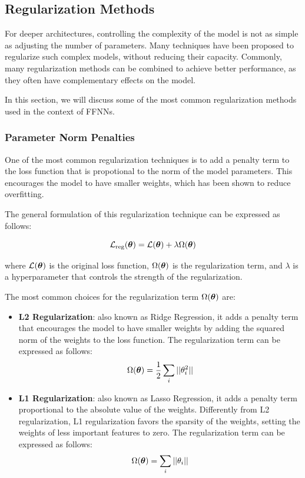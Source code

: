 \subsection{Regularization Methods}
For deeper architectures, controlling the complexity of the model is not as simple as adjusting the number of parameters.
Many techniques have been proposed to regularize such complex models, without reducing their capacity.
Commonly, many regularization methods can be combined to achieve better performance, as they often have complementary effects on the model.

In this section, we will discuss some of the most common regularization methods used in the context of FFNNs.

\subsubsection{Parameter Norm Penalties}

One of the most common regularization techniques is to add a penalty term to the loss function that is propotional to the norm of the model parameters.
This encourages the model to have smaller weights, which has been shown to reduce overfitting.

The general formulation of this regularization technique can be expressed as follows:

\begin{equation*}
    \mathcal{L}_{\text{reg}}(\boldsymbol{\theta}) = \mathcal{L}(\boldsymbol{\theta}) + \lambda \Omega(\boldsymbol{\theta})
\end{equation*}

where $\mathcal{L}(\boldsymbol{\theta})$ is the original loss function, $\Omega(\boldsymbol{\theta})$ is the regularization term, and $\lambda$
is a hyperparameter that controls the strength of the regularization.

The most common choices for the regularization term $\Omega(\boldsymbol{\theta})$ are:
\begin{itemize}
    \item \textbf{L2 Regularization}: also known as Ridge Regression, it adds a penalty term that encourages the model to have smaller weights 
    by adding the squared norm of the weights to the loss function. The regularization term can be expressed as follows:
    \begin{equation*}
        \Omega(\boldsymbol{\theta}) = \frac{1}{2} \sum_{i} ||\theta_i^2||
    \end{equation*}

    \item \textbf{L1 Regularization}: also known as Lasso Regression, it adds a penalty term proportional to the absolute value of the weights.
    Differently from L2 regularization, L1 regularization favors the sparsity of the weights, setting the weights of less important features to zero. 
    The regularization term can be expressed as follows:
    \begin{equation*}
        \Omega(\boldsymbol{\theta}) = \sum_{i} ||\theta_i||
    \end{equation*}
\end{itemize}


